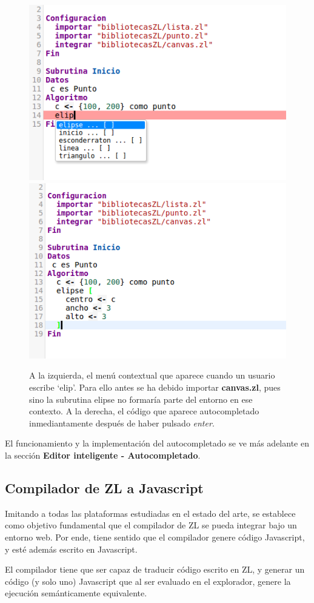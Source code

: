 \documentclass{report}
\begin{document}
\begin{figure}
\centering
\includegraphics[width=0.4\linewidth]{beforecompletion}
\includegraphics[width=0.4\linewidth]{aftercompletion}
\caption[Ejemplo de autocompletado.]{A la izquierda, el menú contextual que aparece cuando un usuario escribe `elip'. Para ello antes se ha debido importar \textbf{canvas.zl}, pues sino la subrutina elipse no formaría parte del entorno en ese contexto. A la derecha, el código que aparece autocompletado inmediantamente después de haber pulsado \textit{enter}.}
\label{fig:completion}
\end{figure}
	
	El funcionamiento y la implementación del autocompletado se ve más adelante en la sección \textbf{Editor inteligente - Autocompletado}.
	
	\subsection{Compilador de ZL a Javascript}
	
	Imitando a todas las plataformas estudiadas en el estado del arte, se establece como objetivo fundamental que el compilador de ZL se pueda integrar bajo un entorno web. Por ende, tiene sentido que el compilador genere código Javascript, y esté además escrito en Javascript. 
	
	\vspace{10px}
	
	El compilador tiene que ser capaz de traducir código escrito en ZL, y generar un código (y solo uno) Javascript que al ser evaluado en el explorador, genere la ejecución semánticamente equivalente. 

	\vspace{10px}
	
\end{document}
